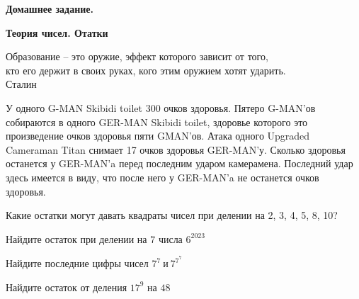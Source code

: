 \centerline{\bf \Huge Домашнее задание.}
\centerline{\bf \Huge Теория чисел. Отатки}

\begin{flushright}
        \scriptsize{Образование – это оружие, эффект которого зависит от того,\\ кто его держит в своих руках, кого этим оружием хотят ударить.\\Сталин}
\end{flushright}

У одного G-MAN Skibidi toilet 300 очков здоровья. Пятеро G-MAN'ов собираются в одного GER-MAN Skibidi toilet, здоровье которого это произведение очков здоровья пяти GMAN'ов. Атака одного Upgraded Cameraman Titan снимает 17 очков здоровья GER-MAN'у. Сколько здоровья останется у GER-MAN'a перед последним ударом камерамена. Последний удар здесь имеется в виду, что после него у GER-MAN'a не останется очков здоровья.

Какие остатки могут давать квадраты чисел при делении на 2, 3, 4, 5, 8, 10?

Найдите остаток при делении на $7$ числа $6^{2023}$

Найдите последние цифры чисел $7^7 \ \text{и} \ 7^{7^{7}}$

Найдите остаток от деления $17^9$ на $48$